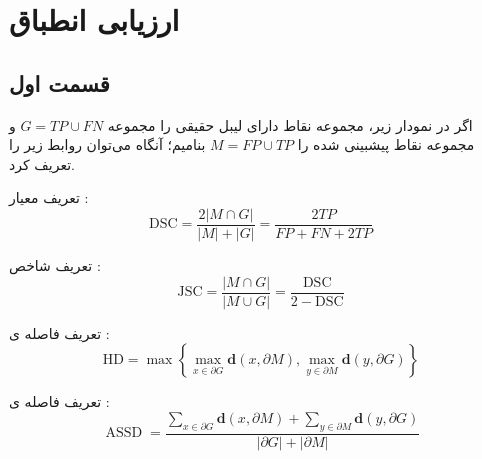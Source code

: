 \chapter{ارزیابی انطباق}

\section{قسمت اول}

اگر در نمودار زیر، مجموعه نقاط دارای لیبل حقیقی را مجموعه $G=TP \cup FN$ و مجموعه نقاط پیشبینی شده را $M=FP \cup TP$ 
بنامیم؛ آنگاه می‌توان روابط زیر را تعریف کرد.
\begin{center}
\def\firstcircle{(0,0) circle (1.7cm)}
\def\secondcircle{(0:1cm) circle (1.7cm)}



\setlength{\parskip}{5mm}
\end{center}

تعریف معیار :
\begin{equation}\mathrm{DSC}=\frac{2|M \cap G|}{|M|+|G|} = \frac{2TP}{FP+FN+2TP}\end{equation}

تعریف شاخص :
\begin{equation}\mathrm{JSC}=\frac{|M \cap G|}{|M \cup G|}=\frac{\mathrm{DSC}}{2-\mathrm{DSC}} \end{equation}


تعریف فاصله ی :
\begin{equation}\mathrm{HD}=\max \left\{\max _{x \in \partial G} \mathbf{d}(x, \partial M), \max _{y \in \partial M} \mathbf{d}(y, \partial G)\right\}\end{equation}

تعریف فاصله ی :
\begin{equation}\operatorname{ASSD}=\frac{\sum_{x \in \partial G} \mathbf{d}(x, \partial M)+\sum_{y \in \partial M} \mathbf{d}(y, \partial G)}{|\partial G|+|\partial M|}\end{equation}


